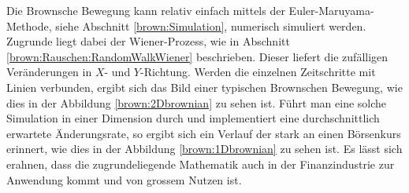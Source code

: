 Die Brownsche Bewegung kann relativ einfach mittels der Euler-Maruyama-Methode, siehe Abschnitt \ref{brown:Simulation}, numerisch simuliert werden. Zugrunde liegt dabei der Wiener-Prozess, wie in Abschnitt \ref{brown:Rauschen:RandomWalkWiener} beschrieben. Dieser liefert die zufälligen Veränderungen in $ X $- und $ Y $-Richtung. Werden die einzelnen Zeitschritte mit Linien verbunden, ergibt sich das Bild einer typischen Brownschen Bewegung, wie dies in der Abbildung \ref{brown:2Dbrownian} zu sehen ist. Führt man eine solche Simulation in einer Dimension durch und implementiert eine durchschnittlich erwartete Änderungsrate, so ergibt sich ein Verlauf der stark an einen Börsenkurs erinnert, wie dies in der Abbildung \ref{brown:1Dbrownian} zu sehen ist. Es lässt sich erahnen, dass die zugrundeliegende Mathematik auch in der Finanzindustrie zur Anwendung kommt und von grossem Nutzen ist.

